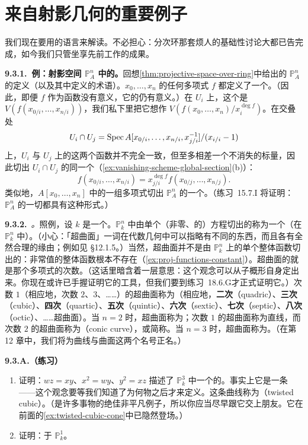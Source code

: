 
\section{来自射影几何的重要例子}

我们现在要用\trGradedRing{}的语言来解读\trClosedEmbedding。不必担心：分次环那套烦人的基础性讨论大都已告完成，如今我们只管坐享先前工作的成果。

\textbf{9.3.1.\ 例：射影空间 $\mathbb{P}^n_A$ 中的\trClosedEmbedding。}\quad 回想\cref{thm:projective-space-over-ring}中给出的 $\mathbb{P}^n_A$ 的定义（以及其中定义的术语）。$x_0,\dots,x_n$ 的任何\trHomogeneous{}多项式 $f$ 都定义了一个\trClosedSubscheme。（因此，即便 $f$ 作为函数没有意义，它的\trVanishingScheme{}仍有意义。）在\trOpenSet{} $U_i$ 上，这个\trClosedSubscheme{}是 $V(f(x_{0/i},\dots,x_{n/i}))$，我们私下里把它想作 $V(f(x_0,\dots,x_n)/x_i^{\deg f})$。在交叠处
\[
U_i\cap U_j=\operatorname{Spec} A[x_{0/i},\dots,x_{n/i},x_{j/i}^{-1}]/(x_{i/i}-1)
\]
上，$U_i$ 与 $U_j$ 上的这两个函数并不完全一致，但至多相差一个不消失的标量，因此切出 $U_i\cap U_j$ 的同一个\trClosedSubscheme（\cref{ex:vanishing-scheme-global-section}(b)）：
\[
f(x_{0/i},\dots,x_{n/i})=x_{j/i}^{\deg f}f(x_{0/j},\dots,x_{n/j}).
\]
类似地，$A[x_0,\dots,x_n]$ 中的一组\trHomogeneous{}多项式切出 $\mathbb{P}^n_A$ 的一个\trClosedSubscheme。（\mbox{练习~15.7.I} 将证明：$\mathbb{P}^n_A$ 的一切\trClosedSubscheme{}都具有这种形式。）

\textbf{9.3.2.}\ \emph{\trhDefinition{}。}\quad 照例，设 $k$ 是一个\trField。$\mathbb{P}^n_k$ 中由单个（非零、\trHomogeneous{}的）方程切出的\trClosedSubscheme{}称为一个\textbf{\trHypersurface}（在 $\mathbb{P}^n_k$ 中）。（小心：「超曲面」一词在代数几何中可以指略有不同的东西，而且各有全然合理的缘由；例如见 \S12.1.5。）当然，超曲面并不是由 $\mathbb{P}^n_k$ 上的单个整体函数切出的：非常值的整体函数根本不存在（\cref{ex:proj-functions-constant}）。超曲面的\trDegree{}就是那个多项式的次数。（这话里暗含着一层意思：这个观念可以从子概形自身定出来。你现在或许已手握证明它的工具，但我们要到\mbox{练习~18.6.G}才正式证明它。）次数 $1$（相应地，次数 $2$、$3$、……）的超曲面称为\trHyperplane{}（相应地，\textbf{二次}（quadric）、\textbf{三次}（cubic）、\textbf{四次}（quartic）、\textbf{五次}（quintic）、\textbf{六次}（sextic）、\textbf{七次}（septic）、\textbf{八次}（octic）、……超曲面）。当 $n=2$ 时，超曲面称为\trCurve；次数 $1$ 的超曲面称为直线，而次数 $2$ 的超曲面称为\trConic{}（conic curve），或简称\trConic。当 $n=3$ 时，超曲面称为\trSurface。（在第 12 章中，我们将为曲线与曲面这两个名号正名。）

\textbf{9.3.A.（练习）}\quad
\begin{enumerate}[label=(\alph*)]
  \item 证明：$wz=xy$、$x^2=wy$、$y^2=xz$ 描述了 $\mathbb{P}^3_k$ 中一个\trIrreducible{}的\trClosedSubscheme。事实上它是一条\trCurve——这个观念要等我们知道了\trDimension{}为何物之后才来定义。这条曲线称为\textbf{\trTwistedCubic{}}（twisted cubic）。（\trTwistedCubic{}是许多事物的绝佳非平凡例子，所以你应当尽早跟它交上朋友。它在前面的\cref{ex:twisted-cubic-cone}中已隐然登场。）
  \item 证明：\trTwistedCubic{}\trIsomorphic{}于 $\mathbb{P}^1_k$。
\end{enumerate}

